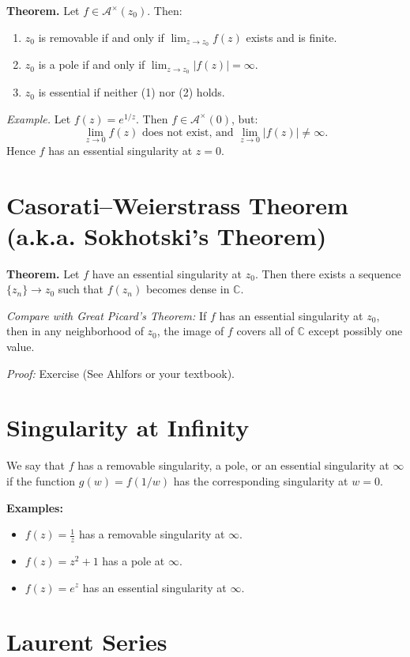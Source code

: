 \documentclass[12pt]{article}
\theoremstyle{definition} %
\theoremstyle{plain} %
\begin{document}
\textbf{Theorem.} Let $f \in \mathcal{A}^\times(z_0)$. Then:
\begin{enumerate}
    \item $z_0$ is removable if and only if $\lim_{z \to z_0} f(z)$ exists and is finite.
    \item $z_0$ is a pole if and only if $\lim_{z \to z_0} |f(z)| = \infty$.
    \item $z_0$ is essential if neither (1) nor (2) holds.
\end{enumerate}

\textit{Example.} Let $f(z) = e^{1/z}$. Then $f \in \mathcal{A}^\times(0)$, but:
\[
\lim_{z \to 0} f(z) \text{ does not exist, and } \lim_{z \to 0} |f(z)| \not= \infty.
\]
Hence $f$ has an essential singularity at $z = 0$.

\section*{Casorati–Weierstrass Theorem (a.k.a. Sokhotski's Theorem)}

\textbf{Theorem.} Let $f$ have an essential singularity at $z_0$. Then there exists a sequence $\{z_n\} \to z_0$ such that $f(z_n)$ becomes dense in $\mathbb{C}$.

\textit{Compare with Great Picard’s Theorem:} If $f$ has an essential singularity at $z_0$, then in any neighborhood of $z_0$, the image of $f$ covers all of $\mathbb{C}$ except possibly one value.

\textit{Proof:} Exercise (See Ahlfors or your textbook).

\section*{Singularity at Infinity}

We say that $f$ has a removable singularity, a pole, or an essential singularity at $\infty$ if the function $g(w) = f(1/w)$ has the corresponding singularity at $w = 0$.

\textbf{Examples:}
\begin{itemize}
    \item $f(z) = \frac{1}{z}$ has a removable singularity at $\infty$.
    \item $f(z) = z^2 + 1$ has a pole at $\infty$.
    \item $f(z) = e^z$ has an essential singularity at $\infty$.
\end{itemize}

\section*{Laurent Series}
\end{document}
